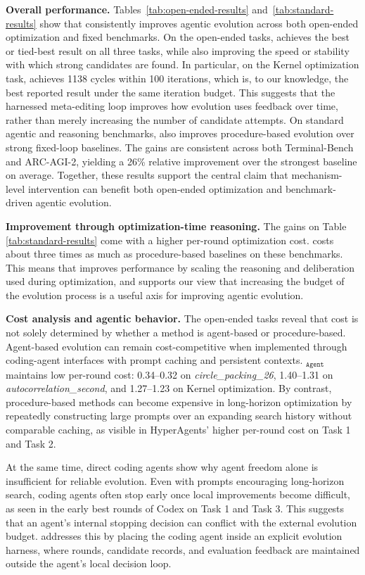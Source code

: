 \textbf{Overall performance.}
Tables~\ref{tab:open-ended-results} and~\ref{tab:standard-results} show that \ourmethod consistently improves agentic evolution across both open-ended optimization and fixed benchmarks.
On the open-ended tasks, \ourmethod achieves the best or tied-best result on all three tasks, while also improving the speed or stability with which strong candidates are found.
In particular, on the Kernel optimization task, \ourmethod achieves 1138 cycles within 100 iterations, which is, to our knowledge, the best reported result under the same iteration budget.
This suggests that the harnessed meta-editing loop improves how evolution uses feedback over time, rather than merely increasing the number of candidate attempts.
On standard agentic and reasoning benchmarks, \ourmethod also improves procedure-based evolution over strong fixed-loop baselines.
The gains are consistent across both Terminal-Bench and ARC-AGI-2, yielding a 26\% relative improvement over the strongest baseline on average.
Together, these results support the central claim that mechanism-level intervention can benefit both open-ended optimization and benchmark-driven agentic evolution.

\textbf{Improvement through optimization-time reasoning.}
The gains on Table \ref{tab:standard-results} come with a higher per-round optimization cost.
\ourmethod costs about three times as much as procedure-based baselines on these benchmarks.
This means that \ourmethod improves performance by scaling the reasoning and deliberation used during optimization, and supports our view that increasing the budget of the evolution process is a useful axis for improving agentic evolution.

\textbf{Cost analysis and agentic behavior.}
The open-ended tasks reveal that cost is not solely determined by whether a method is agent-based or procedure-based.
Agent-based evolution can remain cost-competitive when implemented through coding-agent interfaces with prompt caching and persistent contexts.
\ourmethod$_{\texttt{Agent}}$ maintains low per-round cost: 0.34--0.32 on \textit{circle\_packing\_26}, 1.40--1.31 on \textit{autocorrelation\_second}, and 1.27--1.23 on Kernel optimization.
By contrast, procedure-based methods can become expensive in long-horizon optimization by repeatedly constructing large prompts over an expanding search history without comparable caching, as visible in HyperAgents' higher per-round cost on Task 1 and Task 2.

At the same time, direct coding agents show why agent freedom alone is insufficient for reliable evolution.
Even with prompts encouraging long-horizon search, coding agents often stop early once local improvements become difficult, as seen in the early best rounds of Codex on Task 1 and Task 3.
This suggests that an agent's internal stopping decision can conflict with the external evolution budget.
\ourmethod addresses this by placing the coding agent inside an explicit evolution harness, where rounds, candidate records, and evaluation feedback are maintained outside the agent's local decision loop.


